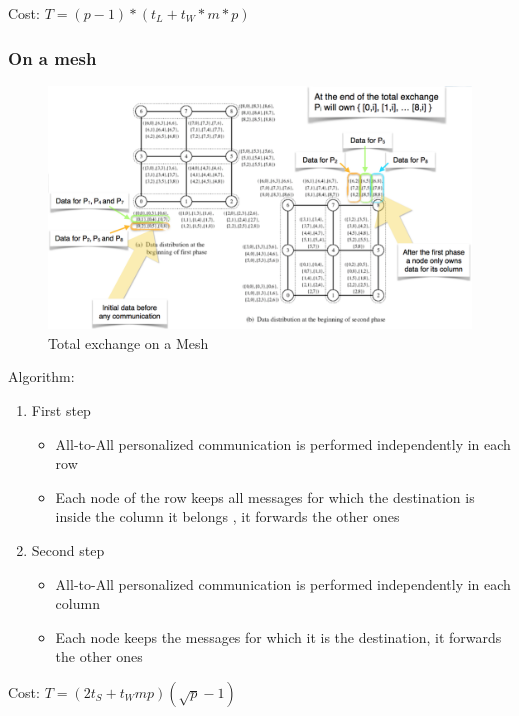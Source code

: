 \documentclass[11pt,a4paper]{report}
\begin{document}
Cost: $ T = (p-1) * (t_{L} + t_{W} * m * p) $

\subsubsection{On a mesh}

\begin{figure}[H]
    \centering
    \includegraphics[width=0.7\linewidth]{img/comm_mesh_totalexchange}
    \caption{Total exchange on a Mesh}
    \label{fig:commmeshtotalexchange}
\end{figure}

Algorithm:

\begin{enumerate}
    \item First step
    \begin{itemize}
        \item All-to-All personalized communication is performed independently 
        in each row
        \item Each node of the row keeps all messages for which the destination 
        is inside the column it belongs , it forwards the other ones
    \end{itemize}

    \item Second step
    \begin{itemize}
        \item All-to-All personalized communication is performed independently 
        in each column
        
        \item Each node keeps the messages for which it is the destination, it 
        forwards the other ones
    \end{itemize}
\end{enumerate}

Cost: $ T=(2t_{S} +t_{W}mp)(\sqrt{p} - 1) $

\end{document}
